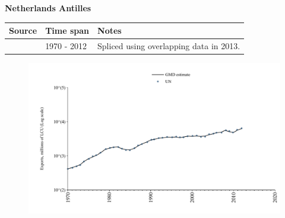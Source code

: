\documentclass[12pt,a4paper,landscape]{article}
\begin{document}
\begin{adjustbox}{max totalsize={\paperwidth}{\paperheight},center}
\begin{minipage}[t][\textheight][t]{\textwidth}
\vspace*{0.5cm}
{}
\begin{center}
{\Large\bfseries Netherlands Antilles}
\end{center}
\vspace{0.5cm}
\begin{table}[H]
\centering
\small
\begin{tabular}{|l|l|l|}
\hline
\textbf{Source} & \textbf{Time span} & \textbf{Notes} \\
\hline
\rowcolor{white}\cite{UN}& 1970 - 2012 &Spliced using overlapping data in 2013.\\
\hline
\end{tabular}
\end{table}
\begin{figure}[H]
\centering
\includegraphics[width=\textwidth,height=0.6\textheight,keepaspectratio]{graphs/ANT_exports.pdf}
\end{figure}
\end{minipage}
\end{adjustbox}
\end{document}
